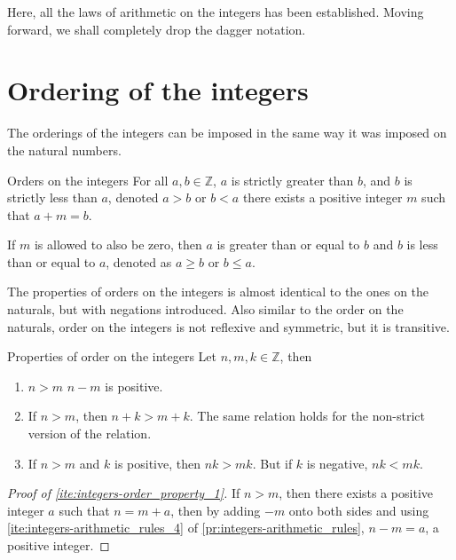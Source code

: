 Here, all the laws of arithmetic on the integers has been established. Moving forward, we shall
completely drop the dagger notation.

\section{Ordering of the integers}

The orderings of the integers can be imposed in the same way it was imposed on the natural numbers.

\begin{df}{Orders on the integers}{}
  For all \(a, b \in \mathbb{Z}\), \(a\) is strictly greater than \(b\), and \(b\) is strictly less
  than \(a\), denoted \(a > b\) or \(b < a\) \ifft there exists a positive integer \(m\) such that
  \(a + m = b\).

  If \(m\) is allowed to also be zero, then \(a\) is greater than or equal to \(b\) and \(b\) is
  less than or equal to \(a\), denoted as \(a \geq b\) or \(b \leq a\).
\end{df}

The properties of orders on the integers is almost identical to the ones on the naturals, but with
negations introduced. Also similar to the order on the naturals, order on the integers is not
reflexive and symmetric, but it is transitive.

\begin{prop}{Properties of order on the integers}{}
  Let \(n, m, k \in \mathbb{Z}\), then
  \begin{enumerate}
    \item \(n > m\) \ifft \(n - m\) is positive.
          \label{ite:integers-order_property_1}
    \item If \(n > m\), then \(n + k > m + k\). The same relation holds for the non-strict version
          of the relation.
          \label{ite:integers-order_property_2}
    \item If \(n > m\) and \(k\) is positive, then \(nk > mk\). But if \(k\) is negative,
          \(nk < mk\).\label{ite:integers-order_property_3}
  \end{enumerate}
\end{prop}

\begin{proof}[Proof of \cref{ite:integers-order_property_1}]
  If \(n > m\), then there exists a positive integer \(a\) such that \(n = m + a\), then by adding
  \(-m\) onto both sides and using \cref{ite:integers-arithmetic_rules_4} of
  \cref{pr:integers-arithmetic_rules}, \(n - m = a\), a positive integer.
\end{proof}


